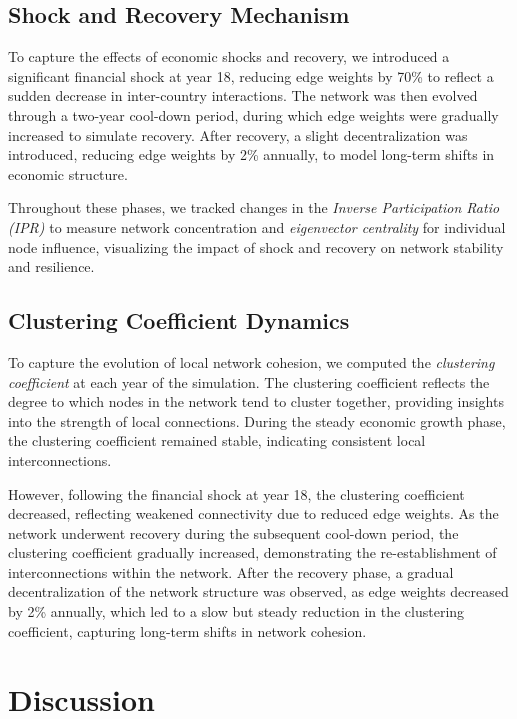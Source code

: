 \documentclass{article} %
\begin{document}
\subsection{Shock and Recovery Mechanism}
To capture the effects of economic shocks and recovery, we introduced a significant financial shock at year 18, reducing edge weights by 70\% to reflect a sudden decrease in inter-country interactions. The network was then evolved through a two-year cool-down period, during which edge weights were gradually increased to simulate recovery. After recovery, a slight decentralization was introduced, reducing edge weights by 2\% annually, to model long-term shifts in economic structure.

Throughout these phases, we tracked changes in the \textit{Inverse Participation Ratio (IPR)} to measure network concentration and \textit{eigenvector centrality} for individual node influence, visualizing the impact of shock and recovery on network stability and resilience.




\subsection{Clustering Coefficient Dynamics}

To capture the evolution of local network cohesion, we computed the \textit{clustering coefficient} at each year of the simulation. The clustering coefficient reflects the degree to which nodes in the network tend to cluster together, providing insights into the strength of local connections. During the steady economic growth phase, the clustering coefficient remained stable, indicating consistent local interconnections. 

However, following the financial shock at year 18, the clustering coefficient decreased, reflecting weakened connectivity due to reduced edge weights. As the network underwent recovery during the subsequent cool-down period, the clustering coefficient gradually increased, demonstrating the re-establishment of interconnections within the network. After the recovery phase, a gradual decentralization of the network structure was observed, as edge weights decreased by 2\% annually, which led to a slow but steady reduction in the clustering coefficient, capturing long-term shifts in network cohesion.


\section{Discussion}
\end{document}
